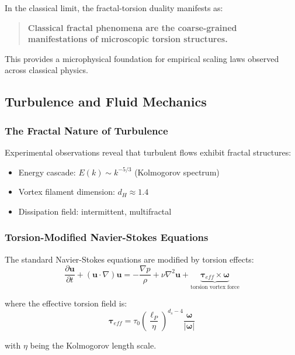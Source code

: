 In the classical limit, the fractal-torsion duality manifests as:
\begin{quote}
\textbf{Classical fractal phenomena are the coarse-grained manifestations of microscopic torsion structures.}
\end{quote}

This provides a microphysical foundation for empirical scaling laws observed across classical physics.

\subsection{Turbulence and Fluid Mechanics}

\subsubsection{The Fractal Nature of Turbulence}

Experimental observations reveal that turbulent flows exhibit fractal structures:
\begin{itemize}
    \item Energy cascade: $E(k) \sim k^{-5/3}$ (Kolmogorov spectrum)
    \item Vortex filament dimension: $d_H \approx 1.4$
    \item Dissipation field: intermittent, multifractal
\end{itemize}

\subsubsection{Torsion-Modified Navier-Stokes Equations}

The standard Navier-Stokes equations are modified by torsion effects:
\begin{equation}
    \frac{\partial \mathbf{u}}{\partial t} + (\mathbf{u} \cdot \nabla)\mathbf{u} = -\frac{\nabla p}{\rho} + \nu \nabla^2 \mathbf{u} + \underbrace{\boldsymbol{\tau}_{eff} \times \boldsymbol{\omega}}_{\text{torsion vortex force}}
\end{equation}

where the effective torsion field is:
\begin{equation}
    \boldsymbol{\tau}_{eff} = \tau_0 \left(\frac{\ell_P}{\eta}\right)^{d_s-4} \frac{\boldsymbol{\omega}}{|\boldsymbol{\omega}|}
\end{equation}

with $\eta$ being the Kolmogorov length scale.

